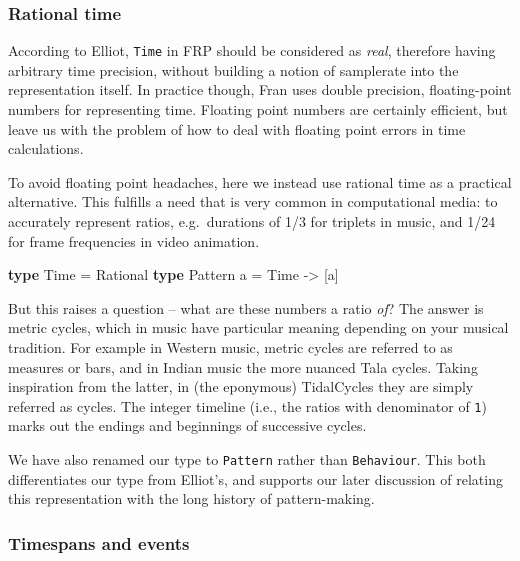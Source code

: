 \documentclass[
]{article}
\newenvironment{Shaded}{}{}
\newcommand{\DataTypeTok}[1]{\textcolor[rgb]{0.56,0.13,0.00}{#1}}
\newcommand{\KeywordTok}[1]{\textcolor[rgb]{0.00,0.44,0.13}{\textbf{#1}}}
\newcommand{\NormalTok}[1]{#1}
\newcommand{\OtherTok}[1]{\textcolor[rgb]{0.00,0.44,0.13}{#1}}
\begin{document}
\subsubsection{Rational time}\label{rational-time}

According to Elliot, \texttt{Time} in FRP should be considered as
\emph{real}, therefore having arbitrary time precision, without building
a notion of samplerate into the representation itself. In practice
though, Fran uses double precision, floating-point numbers for
representing time. Floating point numbers are certainly efficient, but
leave us with the problem of how to deal with floating point errors in
time calculations.

To avoid floating point headaches, here we instead use rational time as
a practical alternative. This fulfills a need that is very common in
computational media: to accurately represent ratios, e.g.~durations of
1/3 for triplets in music, and 1/24 for frame frequencies in video
animation.

\begin{Shaded}
\begin{Highlighting}[]
\KeywordTok{type} \DataTypeTok{Time} \OtherTok{=} \DataTypeTok{Rational}
\KeywordTok{type} \DataTypeTok{Pattern}\NormalTok{ a }\OtherTok{=} \DataTypeTok{Time} \OtherTok{{-}\textgreater{}}\NormalTok{ [a]}
\end{Highlighting}
\end{Shaded}

But this raises a question -- what are these numbers a ratio \emph{of}?
The answer is metric cycles, which in music have particular meaning
depending on your musical tradition. For example in Western music,
metric cycles are referred to as measures or bars, and in Indian music
the more nuanced Tala cycles. Taking inspiration from the latter, in
(the eponymous) TidalCycles they are simply referred as cycles. The
integer timeline (i.e., the ratios with denominator of \texttt{1}) marks
out the endings and beginnings of successive cycles.

We have also renamed our type to \texttt{Pattern} rather than
\texttt{Behaviour}. This both differentiates our type from Elliot's, and
supports our later discussion of relating this representation with the
long history of pattern-making.

\subsubsection{Timespans and events}\label{timespans-and-events}
\end{document}
